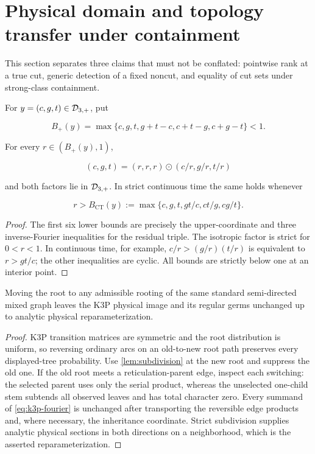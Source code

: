 \section{Physical domain and topology transfer under containment}
\label{sec:physical-topology}

This section separates three claims that must not be conflated: pointwise
rank at a true cut, generic detection of a fixed noncut, and equality of cut
sets under strong-class containment.

\begin{lemma}\label{lem:subdivision}
For \(y=(c,g,t)\in\mathcal D_{3,+}\), put

\[
 B_+(y)=\max\{c,g,t,g+t-c,c+t-g,c+g-t\}<1.
\]

For every \(r\in(B_+(y),1)\),

\[
 (c,g,t)=(r,r,r)\odot(c/r,g/r,t/r)
\]

and both factors lie in \(\mathcal D_{3,+}\).  In strict continuous time the same holds
whenever

\[
 r> B_{\mathrm{CT}}(y)
 :=\max\{c,g,t,gt/c,ct/g,cg/t\}.
\]
\end{lemma}

\begin{proof}
The first six lower bounds are precisely the upper-coordinate and three
inverse-Fourier inequalities for the residual triple.  The isotropic factor
is strict for \(0<r<1\).  In continuous time, for example,
\(c/r>(g/r)(t/r)\) is equivalent to \(r>gt/c\); the other inequalities are
cyclic.  All bounds are strictly below one at an interior point.
\end{proof}

\begin{lemma}\label{lem:root-movement}
Moving the root to any admissible rooting of the same standard semi-directed
mixed graph leaves the K3P physical image and its regular germs unchanged up
to analytic physical reparameterization.
\end{lemma}

\begin{proof}
K3P transition matrices are symmetric and the root distribution is uniform,
so reversing ordinary arcs on an old-to-new root path preserves every
displayed-tree probability.  Use \cref{lem:subdivision} at the new root and
suppress the old one.  If the old root meets a reticulation-parent edge,
inspect each switching: the selected parent uses only the serial product,
whereas the unselected one-child stem subtends all observed leaves and has
total character zero.  Every summand of \eqref{eq:k3p-fourier} is unchanged
after transporting the reversible edge products and, where necessary, the
inheritance coordinate.  Strict subdivision supplies analytic physical
sections in both directions on a neighborhood, which is the asserted
reparameterization.
\end{proof}

